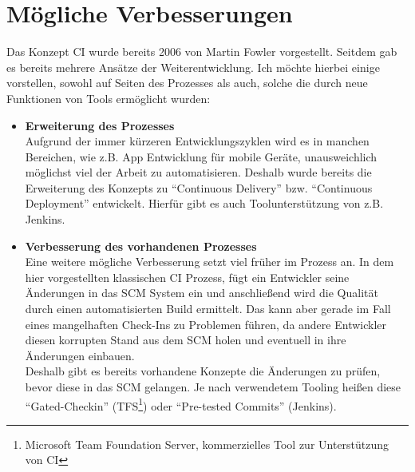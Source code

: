 \section{Mögliche Verbesserungen}
Das Konzept CI wurde bereits 2006 von Martin Fowler vorgestellt. Seitdem gab es bereits mehrere Ansätze der Weiterentwicklung. Ich möchte hierbei einige vorstellen, sowohl auf Seiten des Prozesses als auch, solche die durch neue Funktionen von Tools ermöglicht wurden:
\begin{itemize}
	\item \textbf{Erweiterung des Prozesses}\\
 Aufgrund der immer kürzeren Entwicklungszyklen wird es in manchen Bereichen, wie z.B. App Entwicklung für mobile Geräte, unausweichlich möglichst viel der Arbeit zu automatisieren. Deshalb wurde bereits die Erweiterung des Konzepts zu "`Continuous Delivery"' bzw. "`Continuous Deployment"' entwickelt. Hierfür gibt es auch Toolunterstützung von z.B. Jenkins.
	\item \textbf{Verbesserung des vorhandenen Prozesses}\\
Eine weitere mögliche Verbesserung setzt viel früher im Prozess an. In dem hier vorgestellten klassischen CI Prozess, fügt ein Entwickler seine Änderungen in das SCM System ein und anschließend wird die Qualität durch einen automatisierten Build ermittelt. Das kann aber gerade im Fall eines mangelhaften Check-Ins zu Problemen führen, da andere Entwickler diesen korrupten Stand aus dem SCM holen und eventuell in ihre Änderungen einbauen.\\
Deshalb gibt es bereits vorhandene Konzepte die Änderungen zu prüfen, bevor diese in das SCM gelangen. Je nach verwendetem Tooling heißen diese "`Gated-Checkin"' (TFS\footnote{Microsoft Team Foundation Server, kommerzielles Tool zur Unterstützung von CI}) oder "`Pre-tested Commits"' (Jenkins).

\end{itemize} 